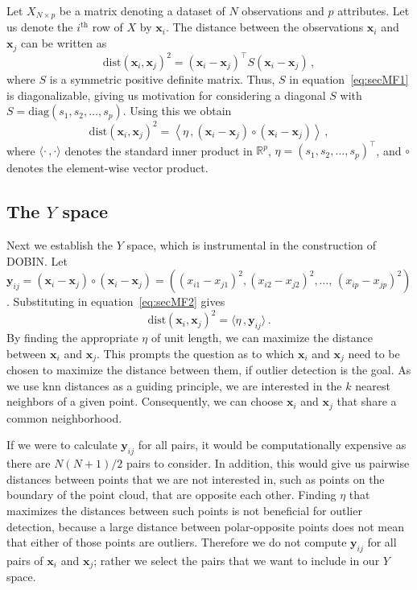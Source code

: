 \documentclass[letter,12pt]{article}
\newcommand{\dist}{\text{dist}}
\newcommand{\diag}{\text{diag}}
\begin{document}
Let $X_{N \times p}$ be a matrix denoting a dataset of $N$ observations and $p$ attributes. Let us denote the $i^{\text{th}}$ row of $X$ by $\bm{x}_i$. The distance between the observations $\bm{x}_i$ and $\bm{x}_j$ can be written as
\begin{equation}\label{eq:secMF1}
	\dist(\bm{x}_i, \bm{x}_j)^2 = ( \bm{x}_i - \bm{x}_j)^\top S ( \bm{x}_i - \bm{x}_j ) \, ,
\end{equation}
where $S$ is a symmetric positive definite matrix. {\color{blue} Thus, $S$ in equation~\eqref{eq:secMF1} is diagonalizable, giving us motivation for considering a diagonal $S$ with } \ $S = \diag(s_1, s_2, \dots, s_p)$. Using this we obtain
\begin{equation}\label{eq:secMF2}
	\dist(\bm{x}_i, \bm{x}_j)^2 = \left\langle \eta\, , ( \bm{x}_i - \bm{x}_j )\circ ( \bm{x}_i - \bm{x}_j ) \right\rangle \,,
\end{equation}
where $\langle \cdot\, , \cdot \rangle$ denotes the standard inner product in $\mathbb{R}^p$, $\eta = (s_1, s_2, \dots, s_p)^\top$, and $\circ$ denotes the element-wise vector product. 



\subsection{The $Y$ space}\label{sec:MathFrame1}

Next we establish the $Y$ space, which is instrumental in the construction of DOBIN\@. Let $\bm{y}_{ij} = ( \bm{x}_i - \bm{x}_j )\circ ( \bm{x}_i - \bm{x}_j ) = \left( ( x_{i1} - x_{j1} )^2, ( x_{i2} - x_{j2} )^2, \dots, \, ( x_{ip} - x_{jp} )^2 \right)$. Substituting in equation~\eqref{eq:secMF2} gives
\begin{equation}\label{eq:secMF3}
	\dist(\bm{x}_i, \bm{x}_j)^2 = \langle \eta\, , \bm{y}_{ij} \rangle\, .
\end{equation}
By finding the appropriate $\eta$ of unit length, we can maximize the distance between $\bm{x}_i$ and $\bm{x}_j$. This prompts the question as to which $\bm{x}_i$ and $\bm{x}_j$ need to be chosen to maximize the distance between them, if outlier detection is the goal. As we use knn distances as a guiding principle, we are interested in the $k$ nearest neighbors of a given point. Consequently, we can choose $\bm{x}_i$ and $\bm{x}_j$ that share a common neighborhood.

If we were to calculate $\bm{y}_{ij}$ for all pairs, it would be computationally expensive as there are $N(N+1)/2$ pairs to consider. In addition, this would give us pairwise distances between points that we are not interested in, such as points on the boundary of the point cloud, that are opposite each other. Finding $\eta$ that maximizes the distances between such points is not beneficial for outlier detection, because a large distance between polar-opposite points does not mean that either of those points are outliers. Therefore we do not compute $\bm{y}_{ij}$ for all pairs of $\bm{x}_i$ and $\bm{x}_j$; rather we select the pairs that we want to include in our $Y$ space.
\end{document}
